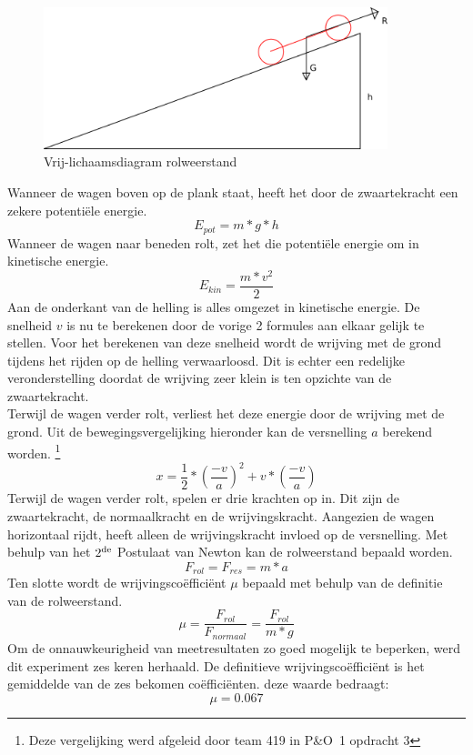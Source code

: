 \begin{figure}[here]
\includegraphics[width=10cm]{bijlagen/rolweerstand/rolweerstand.png}
\caption{Vrij-lichaamsdiagram rolweerstand}
\label{image:rolweerstand}
\end{figure}
Wanneer de wagen boven op de plank staat, heeft het door de zwaartekracht een zekere potenti\"ele energie.
\begin{equation}
E_{pot}=m*g*h
\end{equation}
Wanneer de wagen naar beneden rolt, zet het die potenti\"ele energie om in kinetische energie.
\begin{equation}
E_{kin}=\frac{m*v^2}{2}
\end{equation}
Aan de onderkant van de helling is alles omgezet in kinetische energie. De snelheid $v$ is nu te berekenen door de vorige 2 formules aan elkaar gelijk te stellen. Voor het berekenen van deze snelheid wordt de wrijving met de grond tijdens het rijden op de helling verwaarloosd. Dit is echter een redelijke veronderstelling doordat de wrijving zeer klein is ten opzichte van de zwaartekracht.\\
Terwijl de wagen verder rolt, verliest het deze energie door de wrijving met de grond. Uit de bewegingsvergelijking hieronder kan de versnelling $a$ berekend worden.
\footnote{Deze vergelijking werd afgeleid door team 419 in P\&O~1 opdracht 3}
\begin{equation}
x=\frac{1}{2}*\left(\frac{-v}{a}\right)^2+v*\left(\frac{-v}{a}\right)
\end{equation}
Terwijl de wagen verder rolt, spelen er drie krachten op in. Dit zijn de zwaartekracht, de normaalkracht en de wrijvingskracht. Aangezien de wagen horizontaal rijdt, heeft alleen de wrijvingskracht invloed op de versnelling. Met behulp van het $2\textsuperscript{de}$ Postulaat van Newton kan de rolweerstand bepaald worden.
\begin{equation}
F_{rol}=F_{res}=m*a
\end{equation}
Ten slotte wordt de wrijvingsco\"effici\"ent $\mu$ bepaald met behulp van de definitie van de rolweerstand.
\begin{equation}
\mu=\frac{F_{rol}}{F_{normaal}}=\frac{F_{rol}}{m*g}
\end{equation}
Om de onnauwkeurigheid van meetresultaten zo goed mogelijk te beperken, werd dit experiment zes keren herhaald. De definitieve wrijvingscoëffici\"ent is het gemiddelde van de zes bekomen coëfficiënten. deze waarde bedraagt:$$\mu=0.067$$
